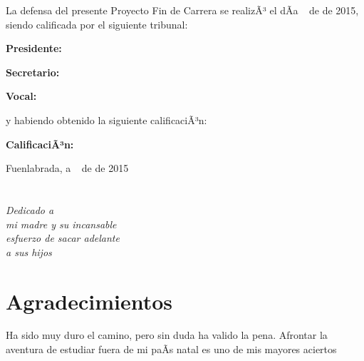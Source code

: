 \documentclass[a4paper, 12pt]{book}
\begin{document}
\vspace{1cm}
La defensa del presente Proyecto Fin de Carrera se realizÃ³ el dÃ­a \qquad$\;\,$ de \qquad\qquad\qquad\qquad \newline de 2015, siendo calificada por el siguiente tribunal:


\vspace{0.5cm}
\textbf{Presidente:}

\vspace{1.2cm}
\textbf{Secretario:}

\vspace{1.2cm}
\textbf{Vocal:}


\vspace{1.2cm}
y habiendo obtenido la siguiente calificaciÃ³n:

\vspace{1cm}
\textbf{CalificaciÃ³n:}


\vspace{1cm}
\begin{flushright}
Fuenlabrada, a \qquad$\;\,$ de \qquad\qquad\qquad\qquad de 2015
\end{flushright}




\chapter*{}
\begin{flushright}
\textit{Dedicado a \\
mi madre y su incansable  \\
esfuerzo de sacar adelante \\
a sus hijos}
\end{flushright}



\chapter*{Agradecimientos}

Ha sido muy duro el camino, pero sin duda ha valido la pena. Afrontar la aventura de
estudiar fuera de mi paÃ­s natal es uno de mis mayores aciertos
\end{document}
